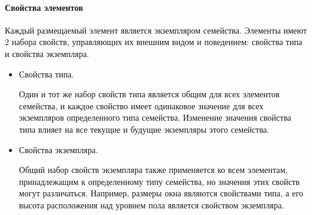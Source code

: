 \paragraph{Свойства элементов}

Каждый размещаемый элемент является экземпляром семейства.
Элементы имеют 2 набора свойств, управляющих их внешним видом и поведением:
свойства типа и свойства экземпляра.%
\cite{DocRevit}

\begin{itemize}
    \item {
        Свойства типа.

        Один и тот же набор свойств типа является общим для всех элементов семейства,
        и каждое свойство имеет одинаковое значение для всех экземпляров определенного типа семейства.
        Изменение значения свойства типа влияет на все текущие и будущие экземпляры этого семейства.
    }
    \item {
        Свойства экземпляра.

        Общий набор свойств экземпляра также применяется ко всем элементам,
        принадлежащим к определенному типу семейства,
        но значения этих свойств могут различаться.
        Например, размеры окна являются свойствами типа,
        а его высота расположения над уровнем пола является свойством экземпляра.
    }
\end{itemize}
